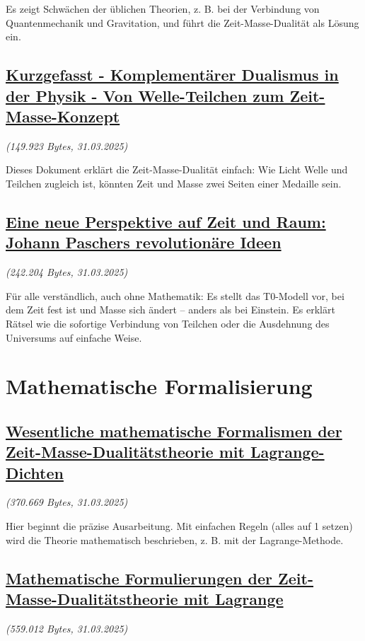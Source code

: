 \documentclass[a4paper,12pt]{article}
\newcommand{\repobase}{https://github.com/jpascher/T0-Time-Mass-Duality/tree/main/2/}
\begin{document}
	Es zeigt Schwächen der üblichen Theorien, z. B. bei der Verbindung von Quantenmechanik und Gravitation, und führt die Zeit-Masse-Dualität als Lösung ein.
	
	\subsection{\small\href{\repobase/pdf/Deutsch kurzgefasst/Kurzgefasst - Komplementärer Dualismus in der Physik - Von Welle-Teilchen zum Zeit-Masse-Konzept.pdf}{Kurzgefasst - Komplementärer Dualismus in der Physik - Von Welle-Teilchen zum Zeit-Masse-Konzept}}
	\textit{(149.923 Bytes, 31.03.2025)}
	
	Dieses Dokument erklärt die Zeit-Masse-Dualität einfach: Wie Licht Welle und Teilchen zugleich ist, könnten Zeit und Masse zwei Seiten einer Medaille sein.
	
	\subsection{\small\href{\repobase/pdf/Deutsch/Eine neue Perspektive auf Zeit und Raum Johann Paschers revolutionäre Ideen.pdf}{Eine neue Perspektive auf Zeit und Raum: Johann Paschers revolutionäre Ideen}}
	\textit{(242.204 Bytes, 31.03.2025)}
	
	Für alle verständlich, auch ohne Mathematik: Es stellt das T0-Modell vor, bei dem Zeit fest ist und Masse sich ändert – anders als bei Einstein. Es erklärt Rätsel wie die sofortige Verbindung von Teilchen oder die Ausdehnung des Universums auf einfache Weise.
	
	\section{Mathematische Formalisierung}
	
	\subsection{\small\href{\repobase/pdf/Deutsch/Wesentliche mathematische Formalismen der Zeit-Masse-Dualitätstheorie mit Lagrange-Dichten.pdf}{Wesentliche mathematische Formalismen der Zeit-Masse-Dualitätstheorie mit Lagrange-Dichten}}
	\textit{(370.669 Bytes, 31.03.2025)}
	
	Hier beginnt die präzise Ausarbeitung. Mit einfachen Regeln (alles auf 1 setzen) wird die Theorie mathematisch beschrieben, z. B. mit der Lagrange-Methode.
	
	\subsection{\small\href{\repobase/pdf/Deutsch/Mathematische Formulierungen der Zeit-Masse-Dualitätstheorie mit Lagrange.pdf}{Mathematische Formulierungen der Zeit-Masse-Dualitätstheorie mit Lagrange}}
	\textit{(559.012 Bytes, 31.03.2025)}
	
\end{document}
